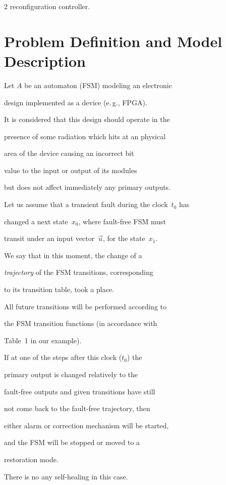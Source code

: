 \begin{multicols}{2}
reconfiguration controller.




\section{Problem Definition and Model Description}



\noindent

Let $A$ be an automaton (FSM) modeling an electronic

design implemented as a device (e.\,g., FPGA).

It is considered that this design should operate in the

presence of some radiation which hits at an physical

area of the device causing an incorrect bit

value to the input or output of   its modules

but does not affect immediately any primary outputs.



Let us assume that a transient fault during the clock~$t_0$ has

changed a next state~$x_0$, where fault-free FSM must

transit under an input vector~$\vec u$, for the state~$x_1$.

We say that in this moment,  the change of a

{\it trajectory} of the FSM transitions, corresponding

to its transition table, took a place.

All future transitions will be performed according to

the FSM transition functions (in accordance with

Table~1 in our example).

If at one of the steps after this clock ($t_0$) the

primary output is changed relatively to the

fault-free outputs and given transitions have still

not come back to the fault-free trajectory, then

either alarm or correction mechanism will be started,

and the FSM will be stopped or moved to a

restoration mode.

There is no any self-healing in this case.








\end{multicols}
